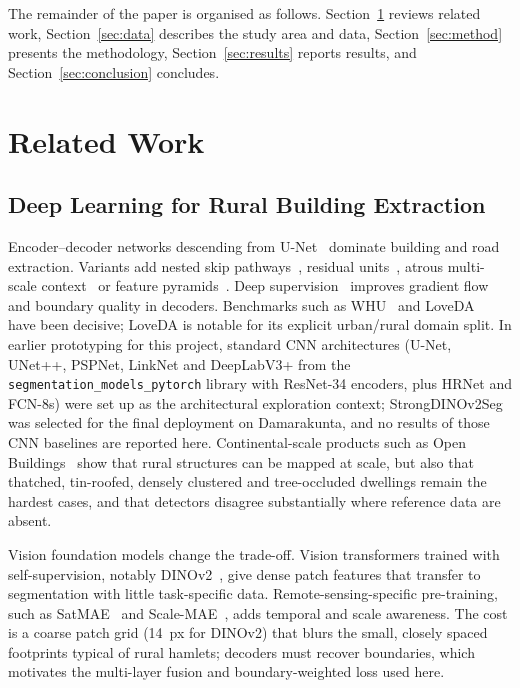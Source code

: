 \documentclass[journal]{IEEEtran}
\begin{document}
The remainder of the paper is organised as follows. Section~\ref{sec:related} reviews related work, Section~\ref{sec:data} describes the study area and data, Section~\ref{sec:method} presents the methodology, Section~\ref{sec:results} reports results, and Section~\ref{sec:conclusion} concludes.

\section{Related Work}\label{sec:related}

\subsection{Deep Learning for Rural Building Extraction}
Encoder--decoder networks descending from U-Net~\cite{ronneberger2015unet} dominate building and road extraction. Variants add nested skip pathways~\cite{zhou2018unetpp}, residual units~\cite{zhang2018resunet}, atrous multi-scale context~\cite{chen2018deeplabv3plus} or feature pyramids~\cite{lin2017fpn}. Deep supervision~\cite{lee2015dsn} improves gradient flow and boundary quality in decoders. Benchmarks such as WHU~\cite{ji2019whu} and LoveDA~\cite{wang2021loveda} have been decisive; LoveDA is notable for its explicit urban/rural domain split. In earlier prototyping for this project, standard CNN architectures (U-Net, UNet++, PSPNet, LinkNet and DeepLabV3+ from the \texttt{segmentation\_models\_pytorch} library with ResNet-34 encoders, plus HRNet and FCN-8s) were set up as the architectural exploration context; StrongDINOv2Seg was selected for the final deployment on Damarakunta, and no results of those CNN baselines are reported here. Continental-scale products such as Open Buildings~\cite{sirko2021openbuildings} show that rural structures can be mapped at scale, but also that thatched, tin-roofed, densely clustered and tree-occluded dwellings remain the hardest cases, and that detectors disagree substantially where reference data are absent.

Vision foundation models change the trade-off. Vision transformers trained with self-supervision, notably DINOv2~\cite{oquab2023dinov2}, give dense patch features that transfer to segmentation with little task-specific data. Remote-sensing-specific pre-training, such as SatMAE~\cite{cong2022satmae} and Scale-MAE~\cite{reed2023scalemae}, adds temporal and scale awareness. The cost is a coarse patch grid (14~px for DINOv2) that blurs the small, closely spaced footprints typical of rural hamlets; decoders must recover boundaries, which motivates the multi-layer fusion and boundary-weighted loss used here.
\end{document}
